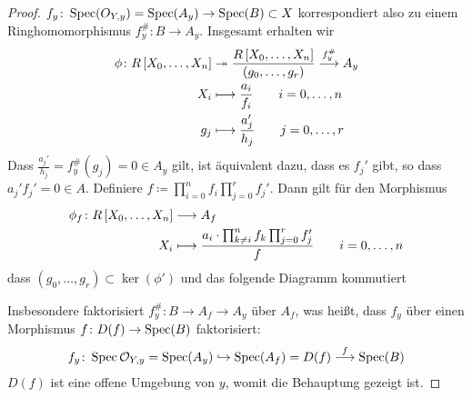 \documentclass[german]{scrreprt}
\begin{document}
\begin{Lemma}
\begin{proof}
    $f_y\colon\operatorname{Spec}(O_{Y,y})=\operatorname{Spec}(A_y)\to\operatorname{Spec}(B)\subset X$
    korrespondiert also zu einem Ringhomomorphismus $f_y^\#\colon B\to
    A_y$.
    Insgesamt erhalten wir
    \begin{align*}
      \phi\colon
      R\left[X_0,\dotsc, X_n\right]
      &\twoheadrightarrow
        \dfrac{R\left[X_0,\dotsc, X_n\right]}{\left(g_0,\dotsc, g_r\right)}
        \overset{f_y^\#}{\longrightarrow}
        A_y\\
      X_i &\longmapsto \frac{a_i}{f_i}
            \qquad i=0,\dotsc, n\\
      g_j &\longmapsto \frac{a_j'}{h_j}
            \qquad j=0,\dotsc, r
    \end{align*}
    Dass $\frac{a_j'}{h_j}=f_y^\#(g_j)=0\in A_y$ gilt, ist äquivalent
    dazu, dass es $f_j'$ gibt, so dass $a_j' f_j'=0\in A$.
    Definiere $f\coloneqq \prod_{i=0}^n f_i \prod_{j=0}^r f_j'$.
    Dann gilt für den Morphismus
    \begin{align*}
      \phi_f\colon
      R\left[X_0,\dotsc, X_n\right]
      &\longrightarrow
        A_f\\
      X_i
      &\longmapsto
        \dfrac{a_i\cdot \prod_{k\neq i}^n f_k \prod_{j=0}^r f_j'}{f}
        \qquad i=0,\dotsc,n
    \end{align*}
    dass $(g_0, \dotsc, g_r)\subset\ker(\phi')$ und das folgende
    Diagramm kommutiert
    \begin{center}
    \end{center}
    Insbesondere faktorisiert $f_y^\#\colon B\to A_f\to A_y$ über
    $A_f$, was heißt, dass $f_y$ über einen Morphismus $f\colon
    D(f)\to\operatorname{Spec}(B)$ faktorisiert:
    \begin{gather*}
      f_y\colon
      \operatorname{Spec}\mathcal{O}_{Y,y}=\operatorname{Spec}(A_y)
      \hookrightarrow \operatorname{Spec}(A_f)=D(f)
      \overset{f}{\longrightarrow} \operatorname{Spec}(B)
    \end{gather*}
    $D(f)$ ist eine offene Umgebung von $y$, womit die Behauptung
    gezeigt ist.
  \end{proof}
\end{Lemma}
\end{document}
